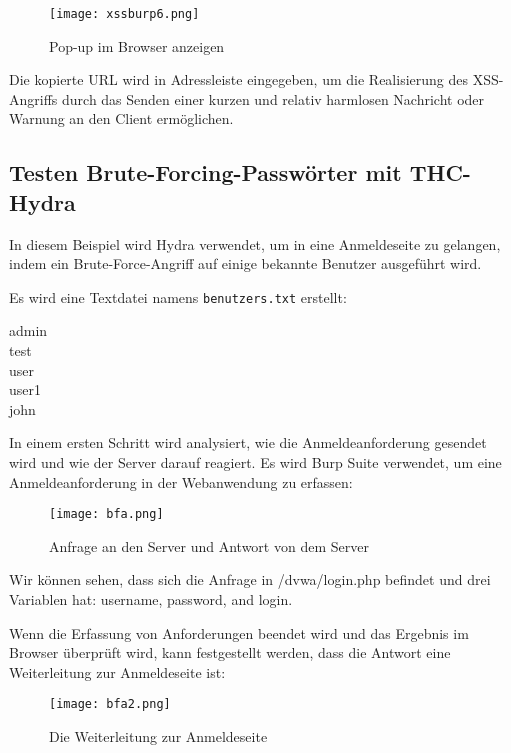 \begin{figure}[h]
	\centering
	\texttt{[image: xssburp6.png]}
	\caption{Pop-up im Browser anzeigen}
\end{figure}

Die kopierte URL wird in Adressleiste eingegeben, um die Realisierung des XSS-Angriffs durch das Senden einer kurzen und relativ harmlosen Nachricht oder Warnung an den Client ermöglichen.

\subsection{Testen Brute-Forcing-Passwörter mit THC-Hydra}

In diesem Beispiel wird Hydra verwendet, um in eine Anmeldeseite zu gelangen, indem ein Brute-Force-Angriff auf einige bekannte Benutzer ausgeführt wird\cite[143]{najera2016kali}.

Es wird eine Textdatei namens \texttt{benutzers.txt} erstellt\cite[143]{najera2016kali}:

\begin{center}
	admin\\test\\user\\user1\\john
\end{center}

In einem ersten Schritt wird analysiert, wie die Anmeldeanforderung gesendet wird und wie der Server darauf reagiert. Es wird Burp Suite verwendet, um eine Anmeldeanforderung in der Webanwendung zu erfassen\cite[144]{najera2016kali}:

\newpage
\begin{figure}[h]
	\centering
	\texttt{[image: bfa.png]}
	\caption{Anfrage an den Server und Antwort von dem Server}
\end{figure}

Wir können sehen, dass sich die Anfrage in /dvwa/login.php befindet und drei Variablen hat: username, password, and login.

Wenn die Erfassung von Anforderungen beendet wird und das Ergebnis im Browser überprüft wird, kann festgestellt werden, dass die Antwort eine Weiterleitung zur Anmeldeseite ist\cite[144]{najera2016kali}:

\begin{figure}[h]
	\centering
	\texttt{[image: bfa2.png]}
	\caption{Die Weiterleitung zur Anmeldeseite}
\end{figure}

